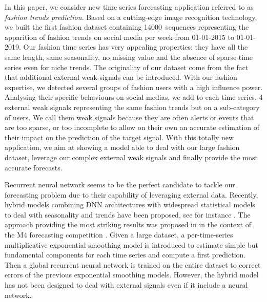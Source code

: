 \documentclass{article} %
\newcommand{\numberts}{14000}
\begin{document}
In this paper, we consider  new time series forecasting application referred to as {\em fashion trends prediction}. Based on a cutting-edge image recognition technology, we built the first fashion dataset containing \numberts\ sequences representing the apparition of fashion trends on social media per week from 01-01-2015 to 01-01-2019. Our fashion time series has very appealing properties: they have all the same length, same seasonality, no missing value and the absence of sparse time series even for niche trends. The originality of our dataset come from the fact that additional external weak signals can be introduced. With our fashion expertise, we detected several groups of fashion users with a high influence power. Analysing their specific behaviours on social medias, we add to each time series, 4 external weak signals representing the same fashion trends but on a sub-category of users. We call them weak signals because they are often alerts or events that are too sparse, or too incomplete to allow on their own an accurate estimation of their impact on the prediction of the target signal. With this totally new application, we aim at showing a model able to deal with our large fashion dataset, leverage our complex external weak signals and finally provide the most accurate forecasts.
 
Recurrent neural network seems to be the perfect candidate to tackle our forecasting problem due to their capability of leveraging external data.  Recently, hybrid models combining DNN architectures with widespread statistical models to deal with seasonality and trends have been proposed, see for instance  \citep{zhang2003time,jianwei2019novel,bandara2020lstm}. The approach providing the most striking results was proposed in  \citep{smyl2020hybrid} in the context of the M4 forecasting competition \citep{makridakis2020m4}.  Given a large dataset, a per-time-series multiplicative exponential smoothing model is introduced to estimate simple but fundamental components for each time series and compute a first prediction. Then a global recurrent neural network is trained on the entire dataset to correct errors of the previous exponential smoothing models. %
However, the hybrid model has not been designed to deal with external signals even if it include a neural network.
\end{document}
